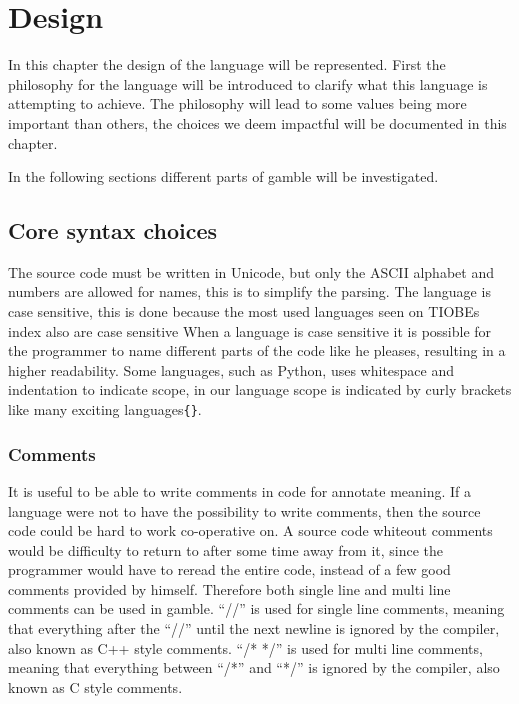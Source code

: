 \chapter{Design}
\label{cha:Design}
In this chapter the design of the language will be represented.
First the philosophy for the language will be introduced to clarify what this language is attempting to achieve.
The philosophy will lead to some values being more important than others, the choices we deem impactful will be documented in this chapter.



In the following sections different parts of \gls{gamble} will be investigated.

\section{Core syntax choices}
The source code must be written in Unicode, but only the ASCII alphabet and numbers are allowed for names, this is to simplify the parsing. 
The language is case sensitive, this is done because the most used languages seen on TIOBEs index\citep{TIOBE} also are case sensitive
When a language is case sensitive it is possible for the programmer to name different parts of the code like he pleases, resulting in a higher readability.
Some languages, such as Python, uses whitespace and indentation to indicate scope, in our language scope is indicated by curly brackets like many exciting languages\texttt{\{\}}.  

\subsection*{Comments}
It is useful to be able to write comments in code for annotate meaning.
If a language were not to have the possibility to write comments, then the source code could be hard to work co-operative on.
A source code whiteout comments would be difficulty to return to after some time away from it, since the programmer would have to reread the entire code, instead of a few good comments provided by himself.\citep{Commenting}
Therefore both single line and multi line comments can be used in \gls{gamble}. 
``//'' is used for single line comments, meaning that everything after the ``//'' until the next newline is ignored by the compiler, also known as C++ style comments. 
``/* */'' is used for multi line comments, meaning that everything between ``/*'' and ``*/'' is ignored by the compiler, also known as C style comments. 

